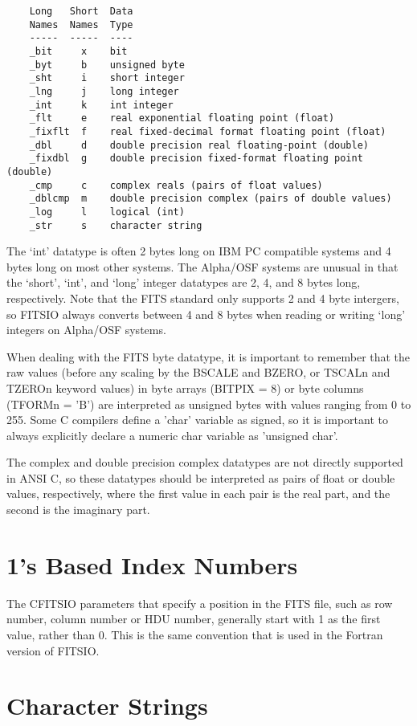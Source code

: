 \begin{verbatim}
    Long   Short  Data
    Names  Names  Type
    -----  -----  ----
    _bit     x    bit
    _byt     b    unsigned byte
    _sht     i    short integer
    _lng     j    long integer
    _int     k    int integer
    _flt     e    real exponential floating point (float)
    _fixflt  f    real fixed-decimal format floating point (float)
    _dbl     d    double precision real floating-point (double)
    _fixdbl  g    double precision fixed-format floating point (double)
    _cmp     c    complex reals (pairs of float values)
    _dblcmp  m    double precision complex (pairs of double values)
    _log     l    logical (int)
    _str     s    character string
\end{verbatim}
The `int' datatype is often 2 bytes long on IBM PC compatible
systems and 4 bytes long on most other systems.  The Alpha/OSF systems
are unusual in that the `short', `int', and `long' integer datatypes
are 2, 4, and 8 bytes long, respectively.  Note that the FITS standard
only supports 2 and 4 byte intergers, so FITSIO always converts between
4 and 8 bytes when reading or writing `long' integers on Alpha/OSF systems.

When dealing with the FITS byte datatype, it is important to remember that
the raw values (before any scaling by the BSCALE and BZERO, or TSCALn
and TZEROn keyword values) in byte arrays (BITPIX = 8) or byte columns
(TFORMn = 'B') are interpreted as unsigned bytes with values ranging
from 0 to 255.  Some C compilers define a 'char' variable as signed, so
it is important to always explicitly declare a numeric char variable as
'unsigned char'.

The complex and double precision complex datatypes are not directly
supported in ANSI C, so these datatypes should be interpreted as pairs
of float or double values, respectively, where the first  value in each
pair is the real part, and the second is the imaginary part.


\section{1's Based Index Numbers}

The CFITSIO parameters that specify a position in the FITS file, such as
row number, column number or HDU number, generally start with 1 as the
first value, rather than 0. This is the same convention that is used in
the Fortran version of FITSIO.


\section{Character Strings}

